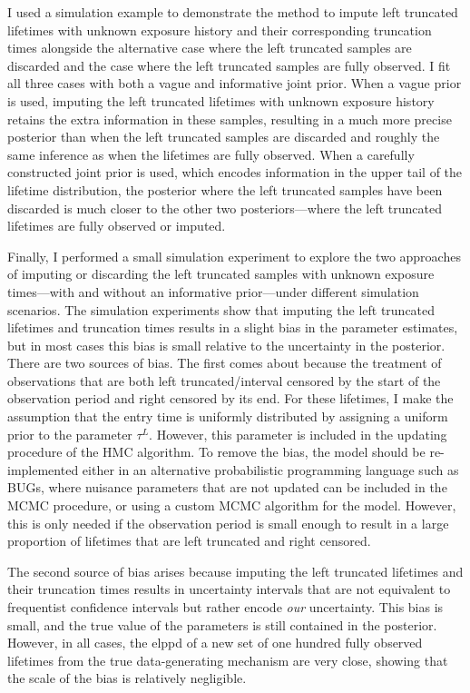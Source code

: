 I used a simulation example to demonstrate the method to impute left truncated lifetimes with unknown exposure history and their corresponding truncation times alongside the alternative case where the left truncated samples are discarded and the case where the left truncated samples are fully observed. I fit all three cases with both a vague and informative joint prior. When a vague prior is used, imputing the left truncated lifetimes with unknown exposure history retains the extra information in these samples, resulting in a much more precise posterior than when the left truncated samples are discarded and roughly the same inference as when the lifetimes are fully observed. When a carefully constructed joint prior is used, which encodes information in the upper tail of the lifetime distribution, the posterior where the left truncated samples have been discarded is much closer to the other two posteriors---where the left truncated lifetimes are fully observed or imputed.

Finally, I performed a small simulation experiment to explore the two approaches of imputing or discarding the left truncated samples with unknown exposure times---with and without an informative prior---under different simulation scenarios. The simulation experiments show that imputing the left truncated lifetimes and truncation times results in a slight bias in the parameter estimates, but in most cases this bias is small relative to the uncertainty in the posterior. There are two sources of bias. The first comes about because the treatment of observations that are both left truncated/interval censored by the start of the observation period and right censored by its end. For these lifetimes, I make the assumption that the entry time is uniformly distributed by assigning a uniform prior to the parameter $\tau^L$. However, this parameter is included in the updating procedure of the HMC algorithm. To remove the bias, the model should be re-implemented either in an alternative probabilistic programming language such as BUGs, where nuisance parameters that are not updated can be included in the MCMC procedure, or using a custom MCMC algorithm for the model. However, this is only needed if the observation period is small enough to result in a large proportion of lifetimes that are left truncated and right censored.

The second source of bias arises because imputing the left truncated lifetimes and their truncation times results in uncertainty intervals that are not equivalent to frequentist confidence intervals but rather encode \textit{our} uncertainty. This bias is small, and the true value of the parameters is still contained in the posterior. However, in all cases, the elppd of a new set of one hundred fully observed lifetimes from the true data-generating mechanism are very close, showing that the scale of the bias is relatively negligible.

